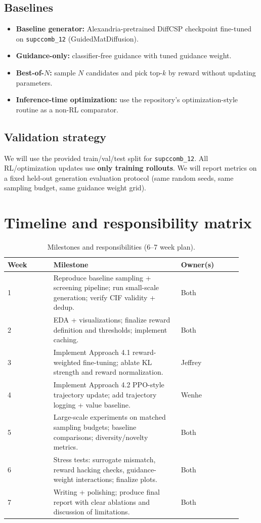 \documentclass{article}
\begin{document}
\subsection{Baselines}
\begin{itemize}
    \item \textbf{Baseline generator:} Alexandria-pretrained DiffCSP checkpoint fine-tuned on \texttt{supccomb\_12} (GuidedMatDiffusion).
    \item \textbf{Guidance-only:} classifier-free guidance with tuned guidance weight.
    \item \textbf{Best-of-$N$:} sample $N$ candidates and pick top-$k$ by reward without updating parameters.
    \item \textbf{Inference-time optimization:} use the repository's optimization-style routine as a non-RL comparator.
\end{itemize}

\subsection{Validation strategy}
We will use the provided train/val/test split for \texttt{supccomb\_12}.
All RL/optimization updates use \textbf{only training rollouts}.
We will report metrics on a fixed held-out generation evaluation protocol (same random seeds, same sampling budget, same guidance weight grid).

\section{Timeline and responsibility matrix}
\begin{table}[h]
\centering
\caption{Milestones and responsibilities (6--7 week plan).}
\label{tab:timeline}
\begin{tabular}{@{}p{0.18\linewidth}p{0.50\linewidth}p{0.24\linewidth}@{}}
\toprule
\textbf{Week} & \textbf{Milestone} & \textbf{Owner(s)} \\
\midrule
1 & Reproduce baseline sampling + screening pipeline; run small-scale generation; verify CIF validity + dedup. & Both \\
2 & EDA + visualizations; finalize reward definition and thresholds; implement caching. & Both \\
3 & Implement Approach 4.1 reward-weighted fine-tuning; ablate KL strength and reward normalization. & Jeffrey \\
4 & Implement Approach 4.2 PPO-style trajectory update; add trajectory logging + value baseline. & Wenhe \\
5 & Large-scale experiments on matched sampling budgets; baseline comparisons; diversity/novelty metrics. & Both \\
6 & Stress tests: surrogate mismatch, reward hacking checks, guidance-weight interactions; finalize plots. & Both \\
7 & Writing + polishing; produce final report with clear ablations and discussion of limitations. & Both \\
\bottomrule
\end{tabular}
\end{table}
\end{document}
